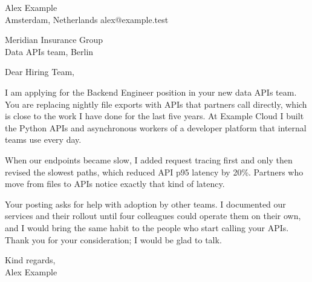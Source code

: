 \documentclass[11pt,a4paper]{article}
\begin{document}
{\large Alex Example}\\
Amsterdam, Netherlands \textperiodcentered{} alex@example.test
\bigskip

Meridian Insurance Group\\
Data APIs team, Berlin

Dear Hiring Team,

I am applying for the Backend Engineer position in your new data APIs team. You
are replacing nightly file exports with APIs that partners call directly, which
is close to the work I have done for the last five years. At Example Cloud I
built the Python APIs and asynchronous workers of a developer platform that
internal teams use every day.

When our endpoints became slow, I added request tracing first and only then
revised the slowest paths, which reduced API p95 latency by 20\%. Partners who
move from files to APIs notice exactly that kind of latency.

Your posting asks for help with adoption by other teams. I documented our
services and their rollout until four colleagues could operate them on their
own, and I would bring the same habit to the people who start calling your
APIs. Thank you for your consideration; I would be glad to talk.

Kind regards,\\
Alex Example
\end{document}
